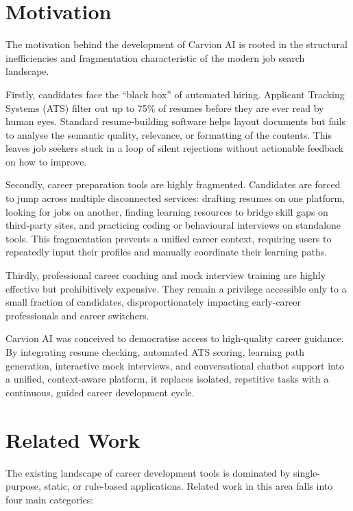 \documentclass[12pt,a4paper]{article}
\begin{document}
\clearpage

\section{Motivation}

The motivation behind the development of Carvion AI is rooted in the structural inefficiencies and fragmentation characteristic of the modern job search landscape. 

Firstly, candidates face the ``black box'' of automated hiring. Applicant Tracking Systems (ATS) filter out up to 75\% of resumes before they are ever read by human eyes. Standard resume-building software helps layout documents but fails to analyse the semantic quality, relevance, or formatting of the contents. This leaves job seekers stuck in a loop of silent rejections without actionable feedback on how to improve.

Secondly, career preparation tools are highly fragmented. Candidates are forced to jump across multiple disconnected services: drafting resumes on one platform, looking for jobs on another, finding learning resources to bridge skill gaps on third-party sites, and practicing coding or behavioural interviews on standalone tools. This fragmentation prevents a unified career context, requiring users to repeatedly input their profiles and manually coordinate their learning paths.

Thirdly, professional career coaching and mock interview training are highly effective but prohibitively expensive. They remain a privilege accessible only to a small fraction of candidates, disproportionately impacting early-career professionals and career switchers.

Carvion AI was conceived to democratise access to high-quality career guidance. By integrating resume checking, automated ATS scoring, learning path generation, interactive mock interviews, and conversational chatbot support into a unified, context-aware platform, it replaces isolated, repetitive tasks with a continuous, guided career development cycle.

\clearpage

\section{Related Work}

The existing landscape of career development tools is dominated by single-purpose, static, or rule-based applications. Related work in this area falls into four main categories:
\end{document}
